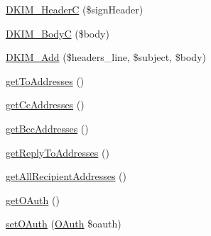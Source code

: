 \begin{DoxyCompactItemize}
\hyperlink{classPHPMailer_1_1PHPMailer_1_1PHPMailer_ad584c404e1d081ed8ba5a019335a606b}{D\+K\+I\+M\+\_\+\+HeaderC} (\$sign\+Header)
\item 
\hyperlink{classPHPMailer_1_1PHPMailer_1_1PHPMailer_ac9e49ede06f0fae5d53c3843cc442110}{D\+K\+I\+M\+\_\+\+BodyC} (\$body)
\item 
\hyperlink{classPHPMailer_1_1PHPMailer_1_1PHPMailer_ac345fdb99d3da987acb38c7d4ec9574d}{D\+K\+I\+M\+\_\+\+Add} (\$headers\+\_\+line, \$subject, \$body)
\item 
\hyperlink{classPHPMailer_1_1PHPMailer_1_1PHPMailer_ac596be7d0d97c21a1fb50898b58905a0}{get\+To\+Addresses} ()
\item 
\hyperlink{classPHPMailer_1_1PHPMailer_1_1PHPMailer_a0701c7b1ca1852e00685cf56262b8e95}{get\+Cc\+Addresses} ()
\item 
\hyperlink{classPHPMailer_1_1PHPMailer_1_1PHPMailer_af5fdaf699d24949720adc5058ab20b4e}{get\+Bcc\+Addresses} ()
\item 
\hyperlink{classPHPMailer_1_1PHPMailer_1_1PHPMailer_afee2c0551ea91355adedd9db0d6ed500}{get\+Reply\+To\+Addresses} ()
\item 
\hyperlink{classPHPMailer_1_1PHPMailer_1_1PHPMailer_a54765cd58729192c7db9ffa6dbaf5bde}{get\+All\+Recipient\+Addresses} ()
\item 
\hyperlink{classPHPMailer_1_1PHPMailer_1_1PHPMailer_a4e8e6cc06fbd73bd44ffa0504aa529a6}{get\+O\+Auth} ()
\item 
\hyperlink{classPHPMailer_1_1PHPMailer_1_1PHPMailer_a8e5b40dd5a3cece37359640398a0709a}{set\+O\+Auth} (\hyperlink{classPHPMailer_1_1PHPMailer_1_1OAuth}{O\+Auth} \$oauth)
\end{DoxyCompactItemize}
